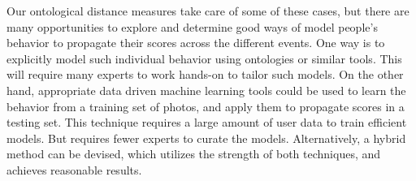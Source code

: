 Our ontological distance measures take care of some of these cases, but there are many opportunities to explore and determine good ways of model people's behavior to propagate their scores across the different events. One way is to explicitly model such individual behavior using ontologies or similar tools. This will require many experts to work hands-on to tailor such models. On the other hand, appropriate data driven machine learning tools could be used to learn the behavior from a training set of photos, and apply them to propagate scores in a testing set. This technique requires a large amount of user data to train efficient models. But requires fewer experts to curate the models. Alternatively, a hybrid method can be devised, which utilizes the strength of both techniques, and achieves reasonable results.